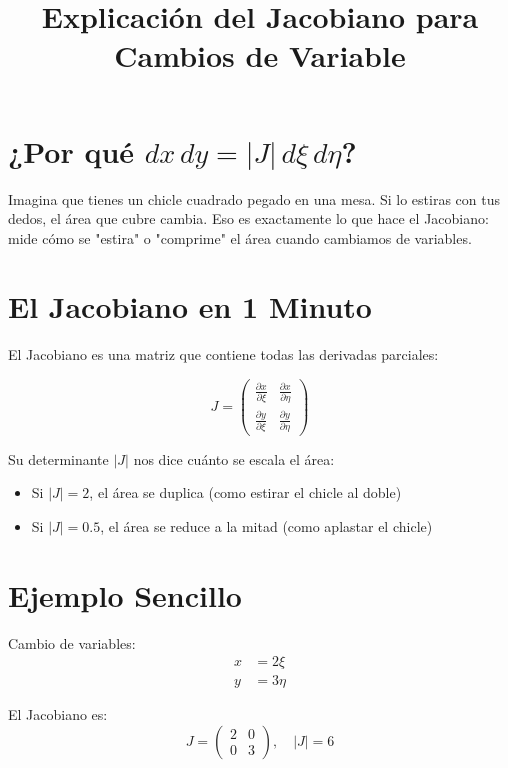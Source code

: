 \documentclass{article}
\title{Explicación del Jacobiano para Cambios de Variable}
\begin{document}
\maketitle

\section{¿Por qué $dx\,dy = |J|\,d\xi\,d\eta$?}

Imagina que tienes un chicle cuadrado pegado en una mesa. Si lo estiras con tus dedos, el área que cubre cambia. Eso es exactamente lo que hace el Jacobiano: mide cómo se "estira" o "comprime" el área cuando cambiamos de variables.

\section{El Jacobiano en 1 Minuto}

El Jacobiano es una matriz que contiene todas las derivadas parciales:

\[
J = \begin{pmatrix}
\frac{\partial x}{\partial \xi} & \frac{\partial x}{\partial \eta} \\
\frac{\partial y}{\partial \xi} & \frac{\partial y}{\partial \eta}
\end{pmatrix}
\]

Su determinante $|J|$ nos dice cuánto se escala el área:

\begin{itemize}
\item Si $|J| = 2$, el área se duplica (como estirar el chicle al doble)
\item Si $|J| = 0.5$, el área se reduce a la mitad (como aplastar el chicle)
\end{itemize}

\section{Ejemplo Sencillo}

Cambio de variables:
\begin{align*}
x &= 2\xi \\
y &= 3\eta
\end{align*}

El Jacobiano es:
\[
J = \begin{pmatrix}
2 & 0 \\
0 & 3
\end{pmatrix}, \quad |J| = 6
\]
\end{document}
